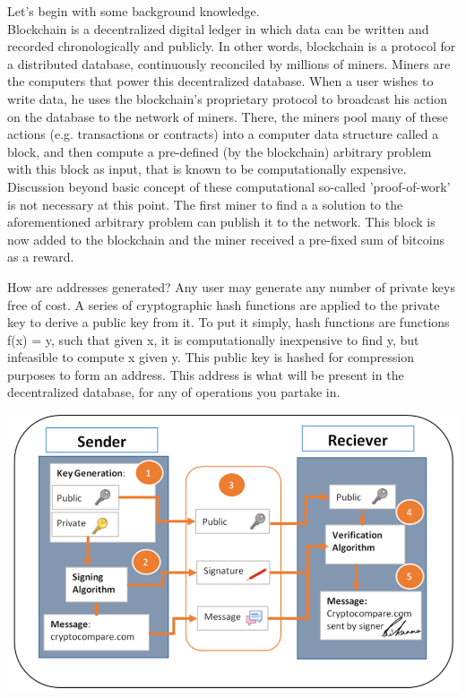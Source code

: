 Let's begin with some background knowledge.\\
Blockchain is a decentralized digital ledger in which data can be written and recorded chronologically and publicly.
In other words, blockchain is a protocol for a distributed database, continuously reconciled by millions of miners.
Miners are the computers that power this decentralized database.
When a user wishes to write data, he uses the blockchain's proprietary protocol to broadcast his action on the database
to the network of miners.
There, the miners pool many of these actions (e.g. transactions or contracts) into a computer data structure called a block,
and then compute a pre-defined (by the blockchain) arbitrary problem with this block as input,
that is known to be computationally expensive.
Discussion beyond basic concept of these computational so-called 'proof-of-work' is not necessary at this point.
The first miner to find a a solution to the aforementioned arbitrary problem can publish it to the network.
This block is now added to the blockchain and the miner received a pre-fixed sum of bitcoins as a reward.

How are addresses generated? 
Any user may generate any number of private keys free of cost.
A series of cryptographic hash functions are applied to the private key to derive a public key from it.
To put it simply, hash functions are functions f(x) = y, such that given x, it is computationally inexpensive to find y,
but infeasible to compute x given y.
This public key is hashed for compression purposes to form an address.
This address is what will be present in the decentralized database, for any of operations you partake in.

\begin{center}
\includegraphics[scale = 0.20]{diagrams/transaction_diagram.png}
\end{center}


